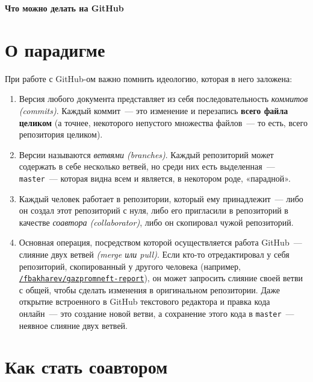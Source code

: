 \documentclass[12pt,a4paper,report]{ncc}
\begin{document}


$\phantom{.}$ \vspace{1.8cm}

{\bf\LARGE\noindent Что можно делать на GitHub}

\renewcommand{\thesection}{\arabic{section}}
\def\ni{\noindent}

\section{О парадигме}

\ni При работе с GitHub-ом важно помнить идеологию, которая в него заложена:

\begin{enumerate}

	\item Версия любого документа представляет из себя последовательность {\it коммитов \linebreak (commits)}. Каждый коммит~— это изменение и перезапись {\bf всего файла целиком} (а точнее, некоторого непустого множества файлов~— то есть, всего репозитория целиком).

	\item Версии называются {\it ветвями (branches)}. Каждый репозиторий может содержать в себе несколько ветвей, но среди них есть выделенная~— {\tt master}~— которая видна всем и является, в некотором роде, «парадной».

	\item Каждый человек работает в репозитории, который ему принадлежит~— либо он создал этот репозиторий с нуля, либо его пригласили в репозиторий в качестве {\it соавтора (collaborator)}, либо он скопировал чужой репозиторий.

	\item Основная операция, посредством которой осуществляется работа GitHub~— слияние двух ветвей {\it (merge или pull)}. Если кто-то отредактировал у себя репозиторий, скопированный у другого человека (например, {\tt \href{https://github.com/fbakharev/gazpromneft-report}{/fbakharev/gazpromneft-report}}), он может запросить слияние своей ветви с общей, чтобы сделать изменения в оригинальном репозитории. Даже открытие встроенного в GitHub текстового редактора и правка кода онлайн~— это создание новой ветви, а сохранение этого кода в {\tt master}~— неявное слияние двух ветвей.

\end{enumerate}


\section{Как стать соавтором}
\end{document}
